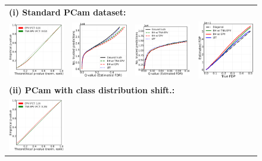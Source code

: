 \documentclass{article}
\begin{document}
\begin{figure}[h!]
	
	\begin{tabular}{cccc}
		\multicolumn{4}{l}{\bf (i) Standard PCam dataset:}\\		
		\includegraphics[width=1.7in]{img/cnn_QQ_pcam.pdf} &
		\includegraphics[width=1.7in]{img/cnn_pcam_fdr_control.pdf} & 
		\includegraphics[width=1.7in]{img/cnn_pcam_fdr_control_loc.pdf} &
		\includegraphics[width=1.7in]{img/cnn_FDPscat_pcam.pdf}\\	
		\multicolumn{4}{l}{\bf (ii) PCam with class distribution shift.:}\\		
		\includegraphics[width=1.7in]{img/cnn_QQ_pcam_balanced.png} &

\end{tabular}
\end{figure}
\end{document}
